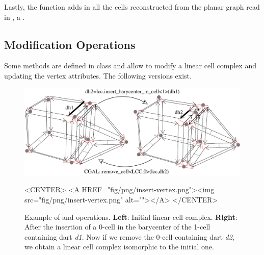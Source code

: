 Lastly, the function  adds in
 all the cells reconstructed from the planar graph read in
, a .

\subsection{Modification Operations}\label{ssec-modif-op}

Some methods are defined in  class and allow
to modify a linear cell complex and updating the vertex attributes.  The
following versions exist.

\begin{figure}[htb]
  \begin{ccTexOnly}
    \begin{center}
      \includegraphics[width=.75\textwidth]{Linear_cell_complex/fig/pdf/insert-vertex}
    \end{center}
  \end{ccTexOnly}
  \begin{ccHtmlOnly}
    <CENTER> <A HREF="fig/png/insert-vertex.png"><img
    src="fig/png/insert-vertex.png" alt=""></A> </CENTER>
  \end{ccHtmlOnly}
  \caption{Example of  and
     operations. \textbf{Left}: Initial linear
    cell complex.  \textbf{Right}: After the insertion of a 0-cell in
    the barycenter of the 1-cell containing dart \emph{d1}.  Now if we
    remove the 0-cell containing dart \emph{d2}, we obtain a linear
    cell complex isomorphic to the initial one.}
  \label{fig-lcc-insert-vertex}
\end{figure}


